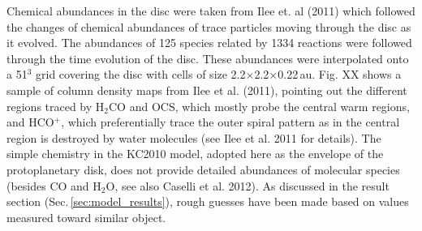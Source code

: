 \documentclass[useAMS,usenatbib]{mn2e}
\begin{document}

Chemical abundances in the disc were taken from Ilee et. al (2011) which followed the changes of chemical abundances of trace particles moving through the disc as it evolved. The abundances of 125 species related by 1334 reactions were followed through the time evolution of the disc. These abundances were interpolated onto a 51$^3$ grid covering the disc with cells of size 2.2$\times$2.2$\times$0.22$\,$au.  Fig. XX shows a sample of column density maps from Ilee et al. (2011), pointing out the different regions traced by H$_2$CO and OCS, which mostly probe the central warm regions, and HCO$^+$, which preferentially trace the outer spiral pattern as in the central region is destroyed by water molecules (see Ilee et al. 2011 for details).   The simple chemistry in the KC2010 model, adopted here as the envelope of the protoplanetary disk, does not provide detailed abundances of molecular species (besides CO and H$_2$O, see also Caselli et al. 2012). As discussed in the result section (Sec.\,\ref{sec:model_results}), rough guesses have been made based on values measured toward similar object. 


\end{document}
